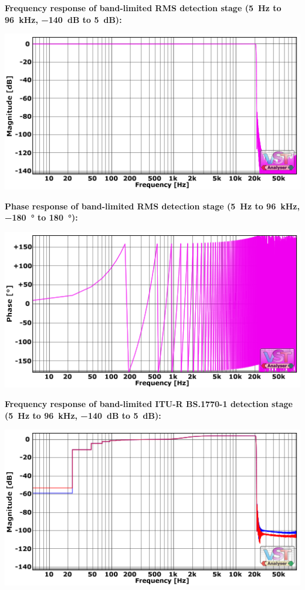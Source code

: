 \textbf{Frequency response of band-limited RMS detection stage
  (\SI{5}{\hertz} to \SI{96}{\kilo\hertz}, \SI{-140}{\dB} to
  \SI{5}{\dB}):}

\begin{center}
  \includegraphics[scale=0.60,clip]{include/images/fft_192khz-freq-rms.png}
\end{center}

\textbf{Phase response of band-limited RMS detection stage
  (\SI{5}{\hertz} to \SI{96}{\kilo\hertz}, \SI{-180}{\degree} to
  \SI[addsign]{+180}{\degree}):}

\begin{center}
  \includegraphics[scale=0.60,clip]{include/images/fft_192khz-phase-rms.png}
\end{center}
\newpage %

\textbf{Frequency response of band-limited ITU-R BS.1770-1 detection stage
  (\SI{5}{\hertz} to \SI{96}{\kilo\hertz}, \SI{-140}{\dB} to
  \SI{5}{\dB}):}

\begin{center}
  \includegraphics[scale=0.60,clip]{include/images/fft_192khz-freq-itu_r.png}
\end{center}


